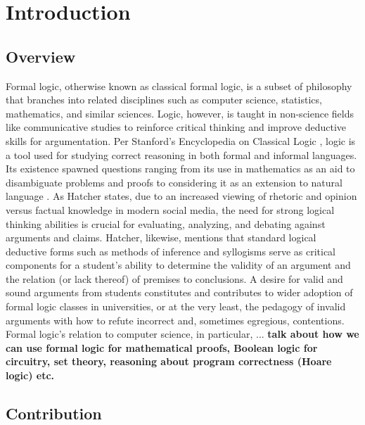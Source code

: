 \documentclass[ms]{uncgdissertationexp2}
\theoremstyle{plain}
\theoremstyle{definition}
\theoremstyle{remark}
\begin{document}
\tableofcontents 
\listoftables   
\listoffigures   

\mainmatter %
\chapter{Introduction}\label{chapter:1}
\section{Overview}
Formal logic, otherwise known as classical formal logic, is a subset of philosophy that branches into related disciplines such as computer science, statistics, mathematics, and similar sciences. Logic, however, is taught in non-science fields like communicative studies to reinforce critical thinking and improve deductive skills for argumentation. Per Stanford's Encyclopedia on Classical Logic \cite{stanfordencyclopedia}, logic is a tool used for studying correct reasoning in both formal and informal languages. Its existence spawned questions ranging from its use in mathematics as an aid to disambiguate problems and proofs to considering it as an extension to natural language \cite{stanfordencyclopedia}. As Hatcher \cite{hatcher} states, due to an increased viewing of rhetoric and opinion versus factual knowledge in modern social media, the need for strong logical thinking abilities is crucial for evaluating, analyzing, and debating against arguments and claims. Hatcher, likewise, mentions that standard logical deductive forms such as methods of inference and syllogisms serve as critical components for a student's ability to determine the validity of an argument and the relation (or lack thereof) of premises to conclusions. A desire for valid and sound arguments from students constitutes and contributes to wider adoption of formal logic classes in universities, or at the very least, the pedagogy of invalid arguments with how to refute incorrect and, sometimes egregious, contentions.  Formal logic's relation to computer science, in particular, ... \textbf{talk about how we can use formal logic for mathematical proofs, Boolean logic for circuitry, set theory, reasoning about program correctness (Hoare logic) etc.}
\section{Contribution}
\end{document}

